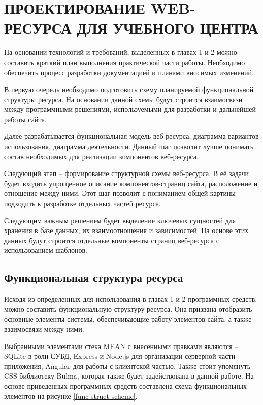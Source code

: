 \section{ПРОЕКТИРОВАНИЕ WEB-РЕСУРСА ДЛЯ УЧЕБНОГО ЦЕНТРА}

На основании технологий и требований, выделенных в главах 1 и 2 можно составить краткий план выполнения практической части работы.
Необходимо обеспечить процесс разработки документацией и планами вносимых изменений.

В первую очередь необходимо подготовить схему планируемой функциональной структуры ресурса.
На основании данной схемы будут строится взаимосвязи между программными решениями, используемыми для разработки и дальнейшей работы сайта.

Далее разрабатывается функциональная модель веб-ресурса, диаграмма вариантов использования, диаграмма деятельности.
Данный шаг позволит лучше понимать состав необходимых для реализации компонентов веб-ресурса.

Следующий этап -- формирование структурной схемы веб-ресурса.
В её задачи будет входить упрощенное описание компонентов-страниц сайта, расположение и отношение между ними.
Этот шаг позволит с пониманием общей картины подходить к разработке отдельных частей ресурса.

Следующим важным решением будет выделение ключевых сущностей для хранения в базе данных, их взаимоотношения и зависимостей.
На основе этих данных будут строится отдельные компоненты страниц веб-ресурса с использованием шаблонов.

\subsection{Функциональная структура ресурса}

Исходя из определенных для использования в главах 1 и 2 программных средств, можно составить функциональную структуру ресурса.
Она призвана отобразить основные элементы системы, обеспечивающие работу элементов сайта, а также взаимосвязи между ними.

Выбранными элементами стека MEAN с внесёнными правками являются -- SQLite в роли СУБД, Express и Node.js для организации серверной части приложения, Angular для работы с клиентской частью.
Также стоит упомянуть CSS-библиотеку Bulma, которая также будет задействована в данной работе.
На основе приведенных программных средств составлена схема функциональных элементов на рисунке \ref{func-struct-scheme}.



